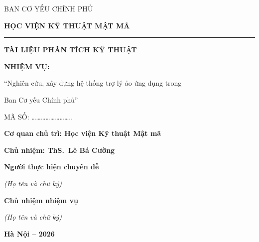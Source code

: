 \documentclass[12pt,a4paper]{report}
\renewcommand{\baselinestretch}{1.25}
\begin{document}
\begin{titlepage}
    \thispagestyle{empty}
    \begingroup
    \setlength{\parindent}{0pt}
    \setlength{\parskip}{0pt}
    \renewcommand{\baselinestretch}{1.0}\selectfont

    \centering
    \vspace*{1.0cm}

    {\normalsize BAN CƠ YẾU CHÍNH PHỦ\par}
    {\bfseries\large HỌC VIỆN KỸ THUẬT MẬT MÃ\par}
    \vspace{0.25cm}
    {\rule{5.6cm}{0.45pt}\par}

    \vspace{4.9cm}
    {\bfseries\LARGE TÀI LIỆU PHÂN TÍCH KỸ THUẬT\par}

    \vspace{3.0cm}
    {\bfseries NHIỆM VỤ: }
    { ``Nghiên cứu, xây dựng hệ thống trợ lý ảo ứng dụng trong\par
    Ban Cơ yếu Chính phủ''\par}
    \vspace{0.25cm}
    \noindent MÃ SỐ: ……………………..\par

    \vspace{2.8cm}
    {\bfseries Cơ quan chủ trì: Học viện Kỹ thuật Mật mã\par}
    {\bfseries Chủ nhiệm: ThS.\ Lê Bá Cường\par}

    \vspace{2.9cm}
    \noindent
    \begin{minipage}[t]{0.45\textwidth}
        \centering
        {\bfseries Người thực hiện chuyên đề\par}
        {\itshape (Họ tên và chữ ký)\par}
    \end{minipage}\hfill
    \begin{minipage}[t]{0.45\textwidth}
        \centering
        {\bfseries Chủ nhiệm nhiệm vụ\par}
        {\itshape (Họ tên và chữ ký)\par}
    \end{minipage}

    \vfill
    {\bfseries Hà Nội -- 2026\par}
    \endgroup
    \restoregeometry
\end{titlepage}
\end{document}
